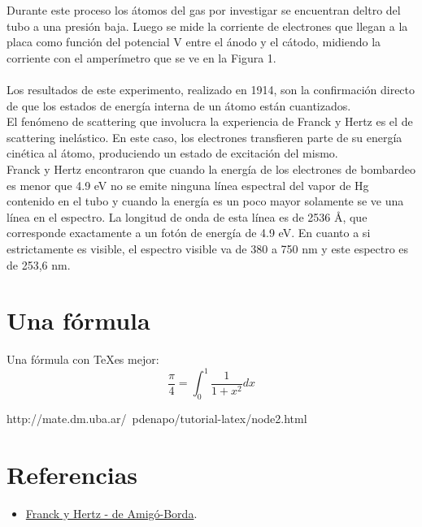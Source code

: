 \documentclass[spanish] {scrartcl}
\begin{document}
\begin{enumerate}[label=\alph*)]
Durante este proceso los átomos del gas por investigar se encuentran deltro del tubo a una presión baja. Luego se mide la corriente de electrones que llegan a la placa como función del potencial V entre el ánodo y el cátodo, midiendo la corriente con el amperímetro que se ve en la Figura 1.\\
\\
Los resultados de este experimento, realizado en 1914, son la confirmación directo de que los estados de energía interna de un átomo están cuantizados.\\
El fenómeno de scattering que involucra
la experiencia de Franck y Hertz es el de scattering inelástico.
En  este  caso,  los  electrones  transfieren  parte  de  su  energía
cinética  al  átomo,  produciendo  un  estado  de  excitación  del
mismo. \\
Franck y Hertz encontraron que cuando la energía de los electrones de bombardeo es menor que 4.9 eV no se emite ninguna línea espectral del vapor de Hg contenido en el tubo y cuando la energía es un poco mayor solamente se ve una línea en el espectro. La longitud de onda de esta línea es de 2536 \AA, que corresponde exactamente a un fotón de energía de 4.9 eV. En cuanto a si estrictamente es visible, el espectro visible va de 380 a 750 nm y este espectro es de 253,6 nm.\\
  \end{enumerate}


\section{Una fórmula}
Una fórmula con \TeX es mejor:
$$ \frac{\pi}{4} = \int_0^1 \frac{1}{1+x^2} dx $$


http://mate.dm.uba.ar/~pdenapo/tutorial-latex/node2.html

\section{Referencias}

\begin{itemize}
  \item \href{http://www.ib.cnea.gov.ar/~experim2/informes2009/Franck\%20y\%20Hertz\%20Amigo\%20Borda.pdf}{Franck y Hertz - de Amigó-Borda}.
\end{itemize}
\end{document}
